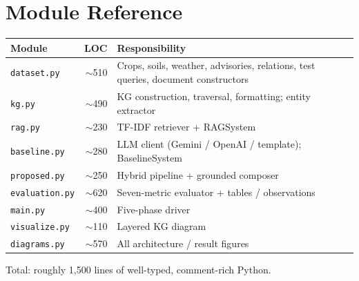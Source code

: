 \documentclass[11pt,a4paper]{article}
\begin{document}
\section{Module Reference}\label{app:modules}
\begin{center}
\small
\begin{tabular}{@{}lrl@{}}
\toprule
Module & LOC & Responsibility \\
\midrule
\texttt{dataset.py}    & $\sim$510 & Crops, soils, weather, advisories, relations, test queries, document constructors \\
\texttt{kg.py}         & $\sim$490 & KG construction, traversal, formatting; entity extractor \\
\texttt{rag.py}        & $\sim$230 & TF-IDF retriever + RAGSystem \\
\texttt{baseline.py}   & $\sim$280 & LLM client (Gemini / OpenAI / template); BaselineSystem \\
\texttt{proposed.py}   & $\sim$250 & Hybrid pipeline + grounded composer \\
\texttt{evaluation.py} & $\sim$620 & Seven-metric evaluator + tables / observations \\
\texttt{main.py}       & $\sim$400 & Five-phase driver \\
\texttt{visualize.py}  & $\sim$110 & Layered KG diagram \\
\texttt{diagrams.py}   & $\sim$570 & All architecture / result figures \\
\bottomrule
\end{tabular}
\end{center}

\noindent Total: roughly 1{,}500 lines of well-typed, comment-rich
Python.

\end{document}
